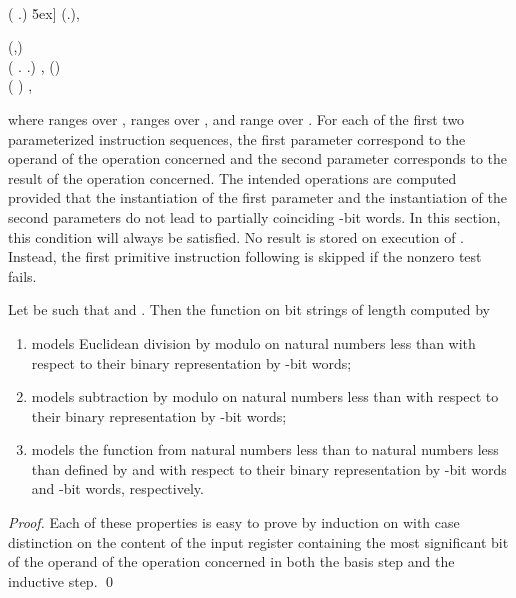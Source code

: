 \documentclass{llncs}
\begin{document}
\begin{ldispl}
\\ \quad
{} 
 ( \conc 
   \conc
  .\setbr{\False}) \conc {}
\.5ex] \quad
{} (.\setbr{\False})\;,
 \end{ldispl}\begin{ldispl}
(,) \deq {}
\\ \quad
{} 
 ( \conc {} \conc
  .\setbr{\False} \conc {} \conc
  .\setbr{\True}) \conc
{} \conc {} \conc {}\;,
\eqnsep
{}() \deq {}
\\ \quad
{} 
 ( \conc {}) \conc {}\;, 
\end{ldispl}where 
 ranges over , 
 ranges over , and
 range over .
For each of the first two parameterized instruction sequences, the first 
parameter correspond to the operand of the operation concerned and the 
second parameter corresponds to the result of the operation concerned.
The intended operations are computed provided that the instantiation of 
the first parameter and the instantiation of the second parameters do 
not lead to partially coinciding -bit words.
In this section, this condition will always be satisfied.
No result is stored on execution of .
Instead, the first primitive instruction following  is 
skipped if the nonzero test fails.

\begin{proposition}
\label{prop-add-basic-operations-correct}
Let  be such that  and .
Then the function on bit strings of length  computed by 
\begin{enumerate}
\item
 models Euclidean division by  
modulo  on natural numbers less than  with respect to their 
binary representation by -bit words;
\item
 models subtraction by  modulo  on 
natural numbers less than  with respect to their binary 
representation by -bit words;
\item
 
models the function  from natural num\-bers less than  
to natural numbers less than  defined by  and 
 with respect to their binary representation by 
-bit words and -bit words, respectively.
\end{enumerate}
\end{proposition}
\begin{proof}
Each of these properties is easy to prove by induction on  with case 
distinction on the content of the input register containing the most 
significant bit of the operand of the operation concerned in both the 
basis step and the inductive step.
\qed
\end{proof}
\end{document}
